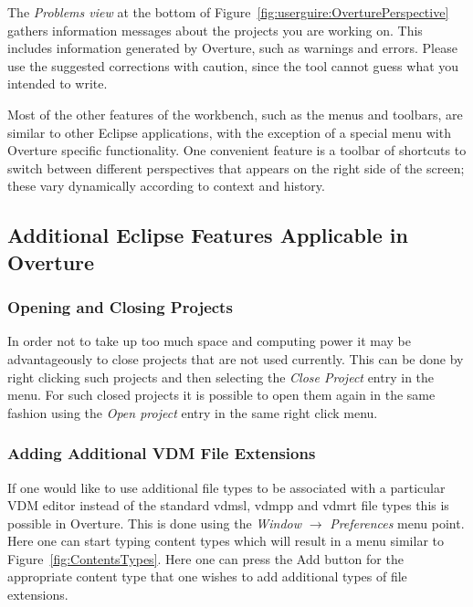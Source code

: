 \documentclass{overturerep}
\begin{document}
{The \emph{Problems view} at the bottom of 
Figure~\ref{fig:userguire:OverturePerspective} gathers 
information messages about the projects you are
working on. This includes information generated by Overture, such as
warnings and errors. Please use the suggested corrections with caution,
since the tool cannot guess what you intended to write.

Most of the other features of the workbench, such as the menus and
toolbars, are similar to other Eclipse applications, with the exception 
of a special menu with Overture specific functionality. One
convenient feature is a toolbar of shortcuts to switch between
different perspectives that appears on the right side of the screen;
these vary dynamically according to context and history.

\subsection{Additional Eclipse Features Applicable in Overture}

\subsubsection{Opening and Closing Projects}

In order not to take up too much space and computing power it may be
advantageously to close projects that are not used currently. This can
be done by right clicking such projects and then selecting the
\emph{Close Project} entry in the menu.
For such closed projects it is possible
to open them again in the same fashion using the \emph{Open project}
entry in the same right click
menu. 
 

\subsubsection{Adding Additional VDM File Extensions}

If one would like to use additional file types to be associated with a
particular VDM editor instead of the standard {\ttfamily vdmsl},
{\ttfamily vdmpp} and {\ttfamily vdmrt} file types this is possible in
Overture. This is done using the \emph{Window} $\rightarrow$
\emph{Preferences} menu point. Here one can start typing {\ttfamily
  content types} which will result in a menu similar to
Figure~\ref{fig:ContentsTypes}. Here one can press the {\ttfamily Add}
button for the appropriate content type that one wishes to add
additional types of file extensions.

}
\end{document}
